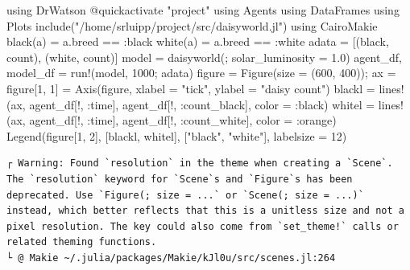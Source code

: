 \documentclass[
  english,
  russian,
  12pt,
  a4paper,
  DIV=11,
  numbers=noendperiod]{scrreprt}
\newenvironment{Shaded}{\begin{snugshade}}{\end{snugshade}}
\newcommand{\BuiltInTok}[1]{\textcolor[rgb]{0.00,0.23,0.31}{#1}}
\newcommand{\FloatTok}[1]{\textcolor[rgb]{0.68,0.00,0.00}{#1}}
\newcommand{\FunctionTok}[1]{\textcolor[rgb]{0.28,0.35,0.67}{#1}}
\newcommand{\ImportTok}[1]{\textcolor[rgb]{0.00,0.46,0.62}{#1}}
\newcommand{\NormalTok}[1]{\textcolor[rgb]{0.00,0.23,0.31}{#1}}
\newcommand{\OperatorTok}[1]{\textcolor[rgb]{0.37,0.37,0.37}{#1}}
\newcommand{\PreprocessorTok}[1]{\textcolor[rgb]{0.68,0.00,0.00}{#1}}
\newcommand{\StringTok}[1]{\textcolor[rgb]{0.13,0.47,0.30}{#1}}
\begin{document}
\begin{Shaded}
\begin{Highlighting}[]
\ImportTok{using} \BuiltInTok{DrWatson}
\PreprocessorTok{@quickactivate} \StringTok{"project"}
\ImportTok{using} \BuiltInTok{Agents}
\ImportTok{using} \BuiltInTok{DataFrames}
\ImportTok{using} \BuiltInTok{Plots}
\FunctionTok{include}\NormalTok{(}\StringTok{"/home/srluipp/project/src/daisyworld.jl"}\NormalTok{)}
\ImportTok{using} \BuiltInTok{CairoMakie}
\FunctionTok{black}\NormalTok{(a) }\OperatorTok{=}\NormalTok{ a.breed }\OperatorTok{==} \OperatorTok{:}\NormalTok{black}
\FunctionTok{white}\NormalTok{(a) }\OperatorTok{=}\NormalTok{ a.breed }\OperatorTok{==} \OperatorTok{:}\NormalTok{white}
\NormalTok{adata }\OperatorTok{=}\NormalTok{ [(black, count), (white, count)]}
\NormalTok{model }\OperatorTok{=} \FunctionTok{daisyworld}\NormalTok{(; solar\_luminosity }\OperatorTok{=} \FloatTok{1.0}\NormalTok{)}
\NormalTok{agent\_df, model\_df }\OperatorTok{=} \FunctionTok{run!}\NormalTok{(model, }\FloatTok{1000}\NormalTok{; adata)}
\NormalTok{figure }\OperatorTok{=} \FunctionTok{Figure}\NormalTok{(size }\OperatorTok{=}\NormalTok{ (}\FloatTok{600}\NormalTok{, }\FloatTok{400}\NormalTok{));}
\NormalTok{ax }\OperatorTok{=}\NormalTok{ figure[}\FloatTok{1}\NormalTok{, }\FloatTok{1}\NormalTok{] }\OperatorTok{=} \FunctionTok{Axis}\NormalTok{(figure, xlabel }\OperatorTok{=} \StringTok{"tick"}\NormalTok{, ylabel }\OperatorTok{=} \StringTok{"daisy count"}\NormalTok{)}
\NormalTok{blackl }\OperatorTok{=} \FunctionTok{lines!}\NormalTok{(ax, agent\_df[!, }\OperatorTok{:}\NormalTok{time], agent\_df[!, }\OperatorTok{:}\NormalTok{count\_black], color }\OperatorTok{=} \OperatorTok{:}\NormalTok{black)}
\NormalTok{whitel }\OperatorTok{=} \FunctionTok{lines!}\NormalTok{(ax, agent\_df[!, }\OperatorTok{:}\NormalTok{time], agent\_df[!, }\OperatorTok{:}\NormalTok{count\_white], color }\OperatorTok{=} \OperatorTok{:}\NormalTok{orange)}
\FunctionTok{Legend}\NormalTok{(figure[}\FloatTok{1}\NormalTok{, }\FloatTok{2}\NormalTok{], [blackl, whitel], [}\StringTok{"black"}\NormalTok{, }\StringTok{"white"}\NormalTok{], labelsize }\OperatorTok{=} \FloatTok{12}\NormalTok{)}
\end{Highlighting}
\end{Shaded}

\begin{verbatim}
┌ Warning: Found `resolution` in the theme when creating a `Scene`. The `resolution` keyword for `Scene`s and `Figure`s has been deprecated. Use `Figure(; size = ...` or `Scene(; size = ...)` instead, which better reflects that this is a unitless size and not a pixel resolution. The key could also come from `set_theme!` calls or related theming functions.
└ @ Makie ~/.julia/packages/Makie/kJl0u/src/scenes.jl:264
\end{verbatim}
\end{document}

